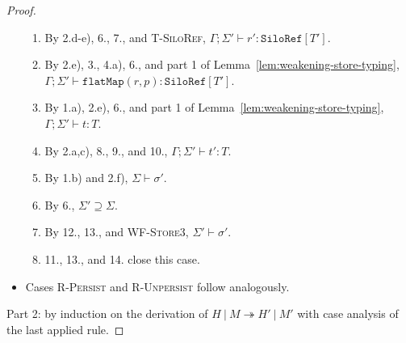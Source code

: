\begin{proof}
\begin{itemize}
\begin{enumerate}
\item By 2.d-e), 6., 7., and \textsc{T-SiloRef}, $\Gamma ; \Sigma' \vdash r' : \texttt{SiloRef}[T']$.
\item By 2.e), 3., 4.a), 6., and part 1 of Lemma~\ref{lem:weakening-store-typing}, $\Gamma ; \Sigma' \vdash \texttt{flatMap}(r, p) : \texttt{SiloRef}[T']$.
\item By 1.a), 2.e), 6., and part 1 of Lemma~\ref{lem:weakening-store-typing}, $\Gamma ; \Sigma' \vdash t : T$.
\item By 2.a,c), 8., 9., and 10., $\Gamma ; \Sigma' \vdash t' : T$.
\item By 1.b) and 2.f), $\Sigma \vdash \sigma'$.
\item By 6., $\Sigma' \supseteq \Sigma$.
\item By 12., 13., and \textsc{WF-Store3}, $\Sigma' \vdash \sigma'$.
\item 11., 13., and 14. close this case.

\end{enumerate}

\item Cases \textsc{R-Persist} and \textsc{R-Unpersist} follow analogously.
\end{itemize}

%
Part 2: by induction on the derivation of $H~|~M \twoheadrightarrow H'~|~M'$ with case analysis of the last applied rule.


\end{proof}
